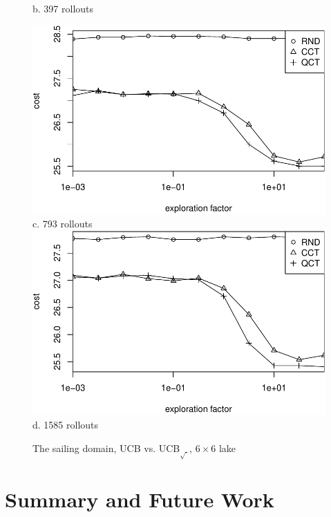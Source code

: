 \documentclass{article}
\begin{document}
\begin{figure}[t]
\begin{minipage}[b]{0.5\linewidth}
    b. 397 rollouts\\
  \end{minipage}
  \begin{minipage}[b]{0.5\linewidth}
    \centering
    \includegraphics[scale=0.45]{rcq-size=6-nsamples=793.pdf}\\
    c. 793 rollouts\\
    \vspace{1em}
    \includegraphics[scale=0.45]{rcq-size=6-nsamples=1585.pdf}\\
    d. 1585 rollouts\\
  \end{minipage}
  \caption{The sailing domain, UCB vs. UCB$_{\sqrt{\cdot}}$, $6\times 6$ lake}
  \label{fig:sailing-rcq-vs-factor}
\end{figure}

\section{Summary and Future Work}
\label{sec:summary}
\end{document}
